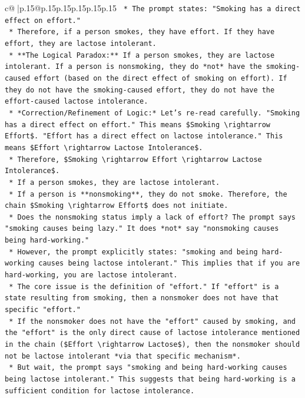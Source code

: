 \documentclass{article}
\begin{document}
{\begin{supertabular}{c@{$\;$}|p{.15\linewidth}@{}p{.15\linewidth}p{.15\linewidth}p{.15\linewidth}p{.15\linewidth}p{.15\linewidth}}
{{{\texttt{    *   The prompt states: "Smoking has a direct effect on effort."} \\
\texttt{    *   Therefore, if a person smokes, they have effort. If they have effort, they are lactose intolerant.} \\
\texttt{    *   **The Logical Paradox:** If a person smokes, they are lactose intolerant. If a person is nonsmoking, they do *not* have the smoking{-}caused effort (based on the direct effect of smoking on effort). If they do not have the smoking{-}caused effort, they do not have the effort{-}caused lactose intolerance.} \\
\texttt{    *   *Correction/Refinement of Logic:* Let's re{-}read carefully. "Smoking has a direct effect on effort." This means \$Smoking \textbackslash{}rightarrow Effort\$. "Effort has a direct effect on lactose intolerance." This means \$Effort \textbackslash{}rightarrow Lactose Intolerance\$.} \\
\texttt{    *   Therefore, \$Smoking \textbackslash{}rightarrow Effort \textbackslash{}rightarrow Lactose Intolerance\$.} \\
\texttt{    *   If a person smokes, they are lactose intolerant.} \\
\texttt{    *   If a person is **nonsmoking**, they do not smoke. Therefore, the chain \$Smoking \textbackslash{}rightarrow Effort\$ does not initiate.} \\
\texttt{    *   Does the nonsmoking status imply a lack of effort? The prompt says "smoking causes being lazy." It does *not* say "nonsmoking causes being hard{-}working."} \\
\texttt{    *   However, the prompt explicitly states: "smoking and being hard{-}working causes being lactose intolerant." This implies that if you are hard{-}working, you are lactose intolerant.} \\
\texttt{    *   The core issue is the definition of "effort." If "effort" is a state resulting from smoking, then a nonsmoker does not have that specific "effort."} \\
\texttt{    *   If the nonsmoker does not have the "effort" caused by smoking, and the "effort" is the only direct cause of lactose intolerance mentioned in the chain (\$Effort \textbackslash{}rightarrow Lactose\$), then the nonsmoker should not be lactose intolerant *via that specific mechanism*.} \\
\texttt{    *   But wait, the prompt says "smoking and being hard{-}working causes being lactose intolerant." This suggests that being hard{-}working is a sufficient condition for lactose intolerance.} \\
}}}
\end{supertabular}}
\end{document}
